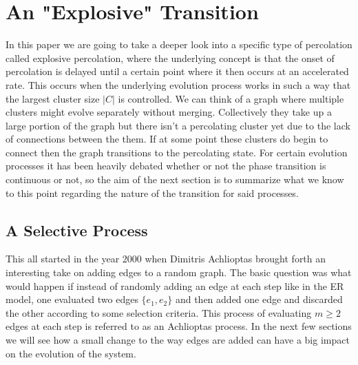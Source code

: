 \section{An "Explosive" Transition}
In this paper we are going to take a deeper look into a specific type of percolation called explosive percolation, where the underlying concept is that the onset of percolation is delayed until a certain point where it then occurs at an accelerated rate.
This occurs when the underlying evolution process works in such a way that the largest cluster size $|C|$ is controlled.
We can think of a graph where multiple clusters might evolve separately without merging.
Collectively they take up a large portion of the graph but there isn't a percolating cluster yet due to the lack of connections between the them.
If at some point these clusters do begin to connect then the graph transitions to the percolating state.
For certain evolution processes it has been heavily debated whether or not the phase transition is continuous or not, so the aim of the next section is to summarize what we know to this point regarding the nature of the transition for said processes.









\subsection{A Selective Process}
This all started in the year 2000 when Dimitris Achlioptas brought forth an interesting take on adding edges to a random graph.
The basic question was what would happen if instead of randomly adding an edge at each step like in the ER model, one evaluated two edges $\{e_1, e_2\}$ and then added one edge and discarded the other according to some selection criteria.
This process of evaluating $m \ge 2$ edges at each step is referred to as an Achlioptas process.
In the next few sections we will see how a small change to the way edges are added can have a big impact on the evolution of the system.









